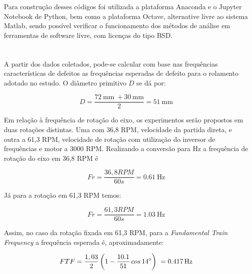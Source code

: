 \documentclass[
	12pt,				
	oneside,			
	a4paper,			
	english,			
	brazil,			
	]{abntex2ppgsi}
\begin{document}
Para construção desses códigos foi utilizada a plataforma Anaconda e o Jupyter Notebook de Python, bem como a plataforma Octave, alternative livre ao sistema Matlab, sendo possível verificar o funcionamento dos métodos de análise em ferramentas de software livre, com licenças do tipo BSD. 

\section{}

A partir dos dados coletados, pode-se calcular com base nas frequências características de defeitos as frequências esperadas de defeito para o rolamento adotado no estudo. O diâmetro primitivo $D$ se dá por: 

\begin{equation}
	D = \frac{\SI{72}{\mm} \ + \SI{30}{\mm}}{2} = \SI{51}{\mm}
	\label{eq: Diametro Primitivo no Rolamento}
\end{equation}


Em relação à frequência de rotação do eixo, os experimentos serão propostos em duas rotações distintas. Uma com 36,8 RPM, velocidade da partida direta, e outra a 61,3 RPM, velocidade de rotação com utilização do inversor de frequências e motor a 3000 RPM. Realizando a conversão para Hz a frequência de rotação do eixo em 36,8 RPM é

\begin{equation}
	Fr = \frac{36,8 RPM} {60s} = \SI{0,61}{\hertz}
	\label{eq: Frequencia do eixo em 36,8 RPM}
\end{equation}

Já para a rotação em 61,3 RPM temos:

\begin{equation}
	Fr = \frac{61,3 RPM} {60s} = \SI{1,03}{\hertz}
	\label{eq: Frequencia do eixo em 61,3 RPM}
\end{equation}

Assim, no caso da rotação fixada em 61,3 RPM, para a \textit{Fundamental Train Frequency} a frequência esperada é, aproximadamente: 

\begin{equation}
	FTF = \frac{1,03}{2} \left ( 1 - \frac{10.1}{51} \,cos \, \ang{14} \right )  \ = \SI{0,417}{{\hertz}}
	\label{eq: FTF no  Rolamento em 100Hz}
\end{equation}
\end{document}
